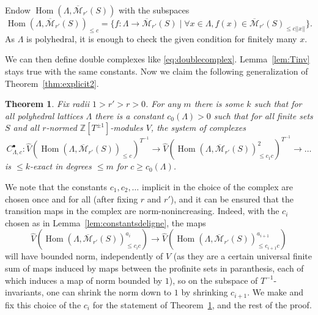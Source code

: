 \documentclass[11pt]{amsart}
\DeclareMathOperator{\Hom}{Hom}
\numberwithin{equation}{section}
\newtheorem{theorem}{Theorem}
\numberwithin{theorem}{section}
\theoremstyle{definition}
\begin{document}
Endow $\Hom(\Lambda,\overline{\mathcal M}_{r'}(S))$ with the subspaces
\[
\Hom(\Lambda,\overline{\mathcal M}_{r'}(S))_{\leq c} = \{f: \Lambda\to \overline{\mathcal M}_{r'}(S)\mid \forall x\in \Lambda, f(x)\in \overline{\mathcal M}_{r'}(S)_{\leq c||x||}\}.
\]
As $\Lambda$ is polyhedral, it is enough to check the given condition for finitely many $x$.

We can then define double complexes like \eqref{eq:doublecomplex}. Lemma~\ref{lem:Tinv} stays true with the same constants. Now we claim the following generalization of Theorem~\ref{thm:explicit2}.

\begin{theorem}\label{thm:explicit3} Fix radii $1>r'>r>0$. For any $m$ there is some $k$ such that for all polyhedral lattices $\Lambda$ there is a constant $c_0(\Lambda)>0$ such that for all finite sets $S$ and all $r$-normed $\mathbb Z[T^{\pm 1}]$-modules $V$, the system of complexes
\[
C_{\Lambda,c}^\bullet: \widehat{V}(\Hom(\Lambda,\overline{\mathcal M}_{r'}(S))_{\leq c})^{T^{-1}}\to \widehat{V}(\Hom(\Lambda,\overline{\mathcal M}_{r'}(S))_{\leq c_1c}^2)^{T^{-1}}\to \ldots
\]
is $\leq k$-exact in degrees $\leq m$ for $c\geq c_0(\Lambda)$.
\end{theorem}

We note that the constants $c_1,c_2,\ldots$ implicit in the choice of the complex are chosen once and for all (after fixing $r$ and $r'$), and it can be ensured that the transition maps in the complex are norm-nonincreasing. Indeed, with the $c_i$ chosen as in Lemma~\ref{lem:constantsdeligne}, the maps
\[
\widehat{V}(\Hom(\Lambda,\overline{\mathcal M}_{r'}(S))_{\leq c_ic}^{a_i})\to \widehat{V}(\Hom(\Lambda,\overline{\mathcal M}_{r'}(S))_{\leq c_{i+1}c}^{a_{i+1}})
\]
will have bounded norm, independently of $V$ (as they are a certain universal finite sum of maps induced by maps between the profinite sets in paranthesis, each of which induces a map of norm bounded by $1$), so on the subspace of $T^{-1}$-invariants, one can shrink the norm down to $1$ by shrinking $c_{i+1}$. We make and fix this choice of the $c_i$ for the statement of Theorem~\ref{thm:explicit3}, and the rest of the proof.
\end{document}
